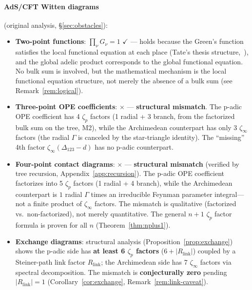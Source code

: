 \documentclass[11pt,a4paper]{article}
\begin{document}
\paragraph{AdS/CFT Witten diagrams} (original analysis, \S\ref{sec:obstacles}):
\begin{itemize}[leftmargin=2em]
    \item \textbf{Two-point functions}: $\prod_\nu G_\nu = 1$ $\checkmark$ --- holds because the Green's function satisfies the local functional equation at each place (Tate's thesis structure,~\cite{HSYZ20}), and the global adelic product corresponds to the global functional equation. No bulk sum is involved, but the mathematical mechanism is the local functional equation structure, not merely the absence of a bulk sum (see Remark~\ref{rem:logical}).
    \item \textbf{Three-point OPE coefficients}: $\times$ --- \textbf{structural mismatch}. The p-adic OPE coefficient has 4 $\zeta_p$ factors (1 radial + 3 branch, from the factorized bulk sum on the tree, M2), while the Archimedean counterpart has only 3 $\zeta_\infty$ factors (the radial $\Gamma$ is canceled by the star-triangle identity). The ``missing'' 4th factor $\zeta_\infty(\Delta_{123}{-}d)$ has no p-adic counterpart.
    \item \textbf{Four-point contact diagrams}: $\times$ --- \textbf{structural mismatch} (verified by tree recursion, Appendix~\ref{app:recursion}). The p-adic OPE coefficient factorizes into 5 $\zeta_p$ factors (1 radial + 4 branch), while the Archimedean counterpart is $1$ radial $\Gamma$ times an irreducible Feynman parameter integral---not a finite product of $\zeta_\infty$ factors. The mismatch is qualitative (factorized vs.\ non-factorized), not merely quantitative. The general $n{+}1$ $\zeta_p$ factor formula is proven for all $n$ (Theorem~\ref{thm:nplus1}).
    \item \textbf{Exchange diagrams}: structural analysis (Proposition~\ref{prop:exchange}) shows the p-adic side has \textbf{at least 6 $\zeta_p$ factors} ($6 + |R_{\mathrm{link}}|$) coupled by a Steiner-path link factor $R_{\mathrm{link}}$; the Archimedean side has 7 $\zeta_\infty$ factors via spectral decomposition. The mismatch is \textbf{conjecturally zero} pending $|R_{\mathrm{link}}| = 1$ (Corollary~\ref{cor:exchange}, Remark~\ref{rem:link-caveat}).
\end{itemize}
\end{document}
